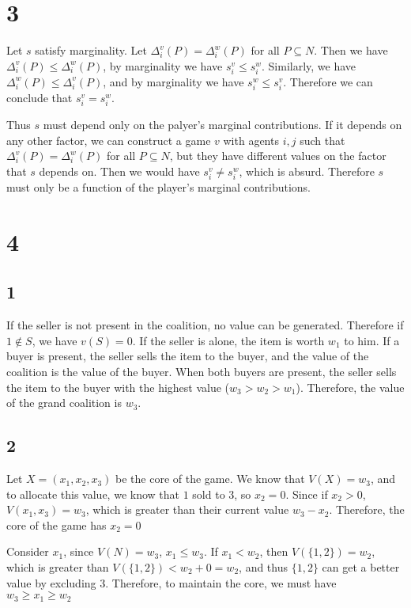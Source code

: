 \documentclass[12pt]{article}
\begin{document}
\newpage
\section*{3}
Let $s$ satisfy marginality. Let $\Delta_i^v(P) = \Delta_i^w(P)$ for all $P \subseteq N$. Then we have $\Delta_i^v(P) \leq \Delta_i^w(P)$, 
by marginality we have $s_i^v \leq s_i^w$. Similarly, we have $\Delta_i^w(P) \leq \Delta_i^v(P)$, and by marginality we have $s_i^w \leq s_i^v$. 
Therefore we can conclude that $s_i^v = s_i^w$. 

Thus $s$ must depend only on the palyer's marginal contributions. If it depends on any other factor, 
we can construct a game $v$ with agents $i, j$ such that $\Delta_i^v(P) = \Delta_i^w(P)$ for all $P \subseteq N$, but they have different values on the factor 
that $s$ depends on. Then we would have $s_i^v \neq s_i^w$, which is absurd. Therefore $s$ must only be a function of the player's marginal contributions.


\newpage
\section*{4}
\subsection*{1}
If the seller is not present in the coalition, no value can be generated. Therefore if 
$1 \not\in S$, we have $v(S)=0$. If the seller is alone, the item is worth $w_1$ to him. If a buyer is present, 
the seller sells the item to the buyer, and the value of the coalition is the value of the buyer. When both buyers 
are present, the seller sells the item to the buyer with the highest value ($w_3 > w_2 > w_1$). Therefore, the value of the grand coalition is 
$w_3$.

\subsection*{2}
Let $X = (x_1, x_2, x_3)$ be the core of the game. We know that $V(X)=w_3$, and to allocate this value, 
we know that $1$ sold to $3$, so $x_2=0$. Since if $x_2 > 0$, $V(x_1, x_3) = w_3$, which is greater than their 
current value $w_3-x_2$. Therefore, the core of the game has $x_2=0$ 

Consider $x_1$, since $V(N) = w_3$, $x_1 \leq w_3$. If $x_1 < w_2$, then $V(\{1, 2\}) = w_2$, which is greater than 
$V(\{1, 2\}) < w_2 + 0 = w_2$, and thus $\{1, 2\}$ can get a better value by excluding $3$. Therefore, to maintain the core, we must have 
$w_3 \geq x_1 \geq w_2$
\end{document}
